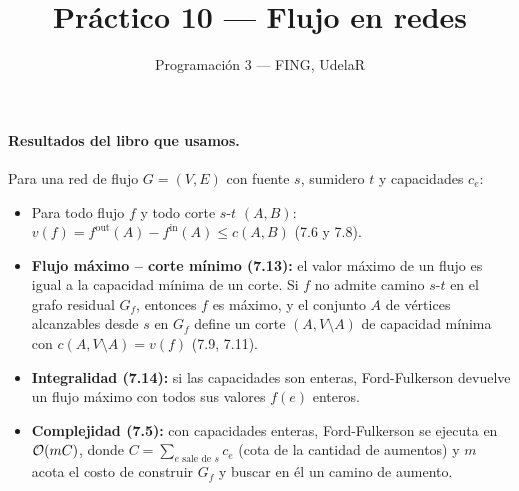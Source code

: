 

\newcommand{\nodosred}{%
  \node[nodo] (s) at (0,0) {$s$};
  \node[nodo] (u) at (2.6,1.5) {$u$};
  \node[nodo] (w) at (2.6,0) {$w$};
  \node[nodo] (y) at (2.6,-1.5) {$y$};
  \node[nodo] (v) at (5.2,1.5) {$v$};
  \node[nodo] (x) at (5.2,0) {$x$};
  \node[nodo] (z) at (5.2,-1.5) {$z$};
  \node[nodo] (t) at (7.8,0) {$t$};
}

\title{Práctico 10 --- Flujo en redes}
\author{Programación 3 --- FING, UdelaR}
\date{}


\maketitle

\paragraph{Resultados del libro que usamos.} Para una red de flujo $G=(V,E)$ con fuente $s$, sumidero $t$ y capacidades $c_e$:
\begin{itemize}
\item Para todo flujo $f$ y todo corte $s$-$t$ $(A,B)$: $v(f)=f^{\mathrm{out}}(A)-f^{\mathrm{in}}(A)\le c(A,B)$ (7.6 y 7.8).
\item \textbf{Flujo máximo -- corte mínimo (7.13):} el valor máximo de un flujo es igual a la capacidad mínima de un corte. Si $f$ no admite camino $s$-$t$ en el grafo residual $G_f$, entonces $f$ es máximo, y el conjunto $A$ de vértices alcanzables desde $s$ en $G_f$ define un corte $(A,V\setminus A)$ de capacidad mínima con $c(A,V\setminus A)=v(f)$ (7.9, 7.11).
\item \textbf{Integralidad (7.14):} si las capacidades son enteras, Ford-Fulkerson devuelve un flujo máximo con todos sus valores $f(e)$ enteros.
\item \textbf{Complejidad (7.5):} con capacidades enteras, Ford-Fulkerson se ejecuta en $\mathcal{O}(mC)$, donde $C=\sum_{e \text{ sale de } s}c_e$ (cota de la cantidad de aumentos) y $m$ acota el costo de construir $G_f$ y buscar en él un camino de aumento.
\end{itemize}

